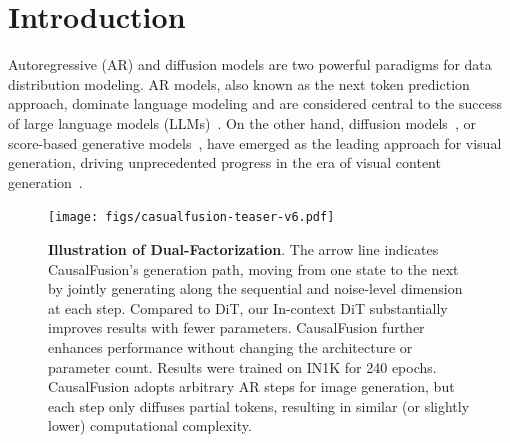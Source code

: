 \vspace{-10pt}
\section{Introduction}
\label{sec:intro}
Autoregressive (AR) and diffusion models are two powerful paradigms for data distribution modeling. AR models, also known as the next token prediction approach, dominate language modeling and are considered central to the success of large language models (LLMs)~\cite{gpt1,gpt2,gpt3,llama1,llama2,llama3}. On the other hand, diffusion models~\cite{ddpm,dit,adm,edm}, or score-based generative models~\cite{songscore,lipman2023flow}, have emerged as the leading approach for visual generation, driving unprecedented progress in the era of visual content generation~\cite{sora,rombach2022high,li2023scaling}. 

\begin{figure}[t]
    \centering
    \texttt{[image: figs/casualfusion-teaser-v6.pdf]} 
    \vspace*{-6mm}
    \caption{
    \textbf{Illustration of Dual-Factorization}. The arrow line indicates CausalFusion's generation path, moving from one state to the next by jointly generating along the sequential and noise-level dimension at each step. 
    Compared to DiT, our In-context DiT substantially improves results with fewer parameters. CausalFusion further enhances performance without changing the architecture or parameter count. Results were trained on IN1K for 240 epochs. CausalFusion adopts arbitrary AR steps for image generation, but each step only diffuses partial tokens, resulting in similar (or slightly lower) computational complexity.
    \vspace{-10pt}
    }
    \label{fig:dual-factorization}
\end{figure}



